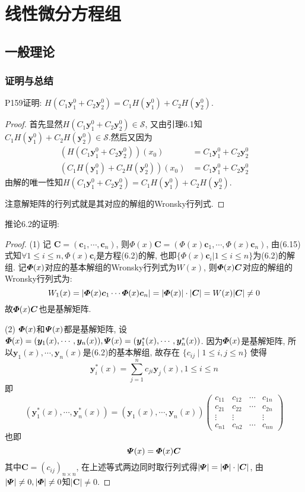 \chapter{线性微分方程组}



\section{一般理论}



\subsection{证明与总结}



P159证明: $H(C_1\bm{y}_1^0+C_2\bm{y}_2^0)=C_1H(\bm{y}_1^0)+C_2H(\bm{y}_2^0)$.
\begin{proof} 首先显然$H(C_1\bm{y}_1^0+C_2\bm{y}_2^0)\in\mathcal{S}$, 
又由引理6.1知$C_1H(\bm{y}_1^0)+C_2H(\bm{y}_2^0)\in\mathcal{S}$.然后又因为
\[\begin{split}\left(H(C_1\bm{y}_1^0+C_2\bm{y}_2^0)\right)(x_0)&=C_1\bm{y}_1^0+C_2\bm{y}_2^0\\
\left(C_1H(\bm{y}_1^0)+C_2H(\bm{y}_2^0)\right)(x_0)&=C_1\bm{y}_1^0+C_2\bm{y}_2^0
\end{split}\]
由解的唯一性知$H(C_1\bm{y}_1^0+C_2\bm{y}_2^0)=C_1H(\bm{y}_1^0)+C_2H(\bm{y}_2^0)$.

注意解矩阵的行列式就是其对应的解组的Wronsky行列式.
\end{proof}

推论6.2的证明:

\begin{proof}
(1) 记 $\bm{C}=(\bm{c}_1,\cdots,\bm{c}_n)$, 则$\bm{\varPhi}(x)\bm{C}=(\bm{\varPhi}(x)\bm{c}_1,\cdots,\bm{\varPhi}(x)\bm{c}_n)$, 由(6.15)式知$\forall1\leq i\leq n,\bm{\varPhi}(x)\bm{c}_i$是方程(6.2)的解, 也即$\{\bm{\varPhi}(x)\bm{c}_i|1\leq i\leq n\}$为(6.2)的解组. 记$\bm{\varPhi}(x)$对应的基本解组的Wronsky行列式为$W(x)$, 则$\bm{\varPhi}(x)\bm{C}$对应的解组的Wronsky行列式为:
\[W_1(x)=|\bm{\varPhi}(x)\bm{c}_1\cdots\bm{\varPhi}(x)\bm{c}_n|=|\bm{\varPhi}(x)|\cdot|\bm{C}|=W(x)|\bm{C}|\neq0\]
故$\bm{\varPhi}(x)\bm{C}$也是基解矩阵.

(2) $\bm{\varPhi}(x)$和$\bm{\varPsi}(x)$都是基解矩阵, 
设$\bm{\varPhi}(x)=(\bm{y}_1(x),\cdots,\bm{y}_n(x)),\bm{\varPsi}(x)=(\bm{y}_1^*(x),\cdots,\bm{y}_n^*(x))$. 
因为$\bm{\varPhi}(x)$是基解矩阵, 所以$\bm{y}_1(x),\cdots,\bm{y}_n(x)$是(6.2)的基本解组, 
故存在 $\{c_{ij}\mid 1\leq i,j\leq n\}$ 使得
\[\bm{y}_i^*(x)=\sum_{j=1}^nc_{ji}\bm{y}_j(x),1\leq i\leq n\]
即
\[(\bm{y}_1^*(x),\cdots,\bm{y}_n^*(x))=(\bm{y}_1(x),\cdots,\bm{y}_n(x))
\begin{pmatrix}
c_{11}&c_{12}&\cdots&c_{1n}\\
c_{21}&c_{22}&\cdots&c_{2n}\\
\vdots&\vdots&&\vdots\\
c_{n1}&c_{n2}&\cdots&c_{nn}
\end{pmatrix}\]
也即\[\bm{\varPsi}(x)=\bm{\varPhi}(x)\bm{C}\]
其中$\bm{C}=(c_{ij})_{n\times n}$, 在上述等式两边同时取行列式得$|\bm{\varPsi}|=|\bm{\varPhi}|\cdot|\bm{C}|$, 
由$|\bm{\varPsi}|\neq0,|\bm{\varPhi}|\neq0$知$|\bm{C}|\neq0$.
\end{proof}



